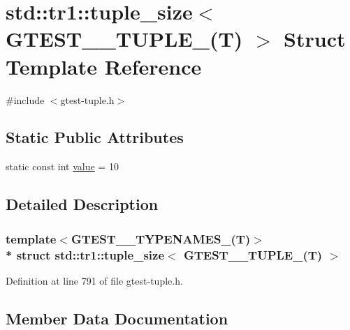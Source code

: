 \hypertarget{structstd_1_1tr1_1_1tuple__size_3_01_g_t_e_s_t__10___t_u_p_l_e___07_t_08_01_4}{}\section{std\+:\+:tr1\+:\+:tuple\+\_\+size$<$ G\+T\+E\+S\+T\+\_\+\_\+\+T\+U\+P\+L\+E\+\_\+(T) $>$ Struct Template Reference}
\label{structstd_1_1tr1_1_1tuple__size_3_01_g_t_e_s_t__10___t_u_p_l_e___07_t_08_01_4}


{\ttfamily \#include $<$gtest-\/tuple.\+h$>$}

\subsection*{Static Public Attributes}
\begin{DoxyCompactItemize}
\item 
static const int \hyperlink{structstd_1_1tr1_1_1tuple__size_3_01_g_t_e_s_t__10___t_u_p_l_e___07_t_08_01_4_a8181de395f9761be991e4cbdef144373}{value} = 10
\end{DoxyCompactItemize}


\subsection{Detailed Description}
\subsubsection*{template$<$G\+T\+E\+S\+T\+\_\+\_\+\+T\+Y\+P\+E\+N\+A\+M\+E\+S\+\_\+(\+T)$>$\\*
struct std\+::tr1\+::tuple\+\_\+size$<$ G\+T\+E\+S\+T\+\_\+\_\+\+T\+U\+P\+L\+E\+\_\+(\+T) $>$}



Definition at line 791 of file gtest-\/tuple.\+h.



\subsection{Member Data Documentation}
